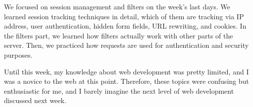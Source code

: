 We focused on session management and filters on the week's last days. We learned session tracking techniques in detail, which of them are tracking via IP address, user authentication, hidden form fields, URL rewriting, and cookies. In the filters part, we learned how filters actually work with other parts of the server. Then, we practiced how requests are used for authentication and security purposes.

Until this week, my knowledge about web development was pretty limited, and I was a novice to the web at this point. Therefore, these topics were confusing but enthusiastic for me, and I barely imagine the next level of web development discussed next week.